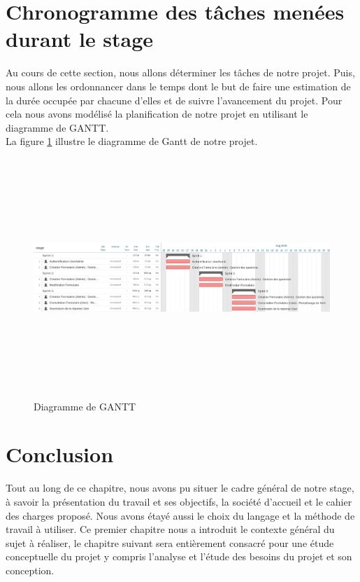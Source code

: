 \section{Chronogramme des tâches menées durant le stage}
Au cours de cette section, nous allons déterminer les tâches de notre projet. Puis, nous
allons les ordonnancer dans le temps dont le but de faire une estimation de la durée occupée
par chacune d’elles et de suivre l’avancement du projet.
Pour cela nous avons modélisé la planification de notre projet en utilisant le diagramme de GANTT.\\
La figure \ref{figger} illustre le diagramme de Gantt de notre projet.
    \begin{figure} [H]
    \centering
         \begin{center}
             \includegraphics [width=18cm,height=9cm] {img/GANTTdiag.jpg}
            \caption{Diagramme de GANTT}
            \label{figger}
        \end{center}
    \end{figure}
    
\section{Conclusion}
Tout au long de ce chapitre, nous avons pu situer le cadre général de notre stage, à savoir la présentation du travail et ses objectifs, la société d’accueil et le cahier des charges proposé. Nous avons étayé aussi le choix du langage et la méthode de travail à utiliser.
Ce premier chapitre nous a introduit le contexte général du sujet à réaliser, le chapitre suivant sera entièrement consacré pour une étude conceptuelle du projet y compris l'analyse et l'étude des besoins du projet et son conception.